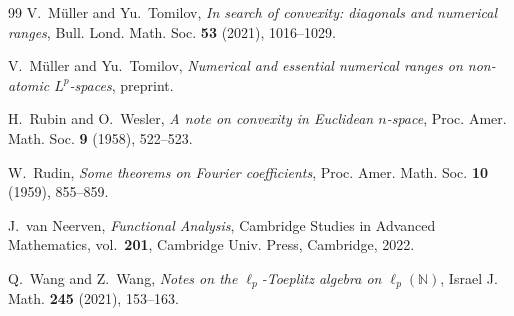 \documentclass[11pt]{amsart}
\numberwithin{equation}{section}
\theoremstyle{definition}
\theoremstyle{remark}
\begin{document}
\begin{thebibliography}{99}
V.~M\"uller and Yu.~Tomilov,
\emph{In search of convexity: diagonals and numerical ranges},
Bull. Lond. Math. Soc. \textbf{53} (2021),  1016--1029.

V.~M\"uller and Yu.~Tomilov,
\emph{Numerical and essential numerical ranges on non-atomic $L^p$-spaces},
preprint.

H.~Rubin and O.~Wesler,
\emph{A note on convexity in Euclidean $n$-space},
Proc. Amer. Math. Soc. \textbf{9} (1958), 522--523.

W.~Rudin,
\emph{Some theorems on Fourier coefficients},
Proc. Amer. Math. Soc. \textbf{10} (1959), 855--859.

J.~van Neerven,
\emph{Functional Analysis},
Cambridge Studies in Advanced Mathematics, vol.~\textbf{201},
Cambridge Univ. Press, Cambridge, 2022.

Q.~Wang and Z.~Wang,
\emph{Notes on the \(\ell_p\)-Toeplitz algebra on \(\ell_p(\mathbb N)\)},
Israel J. Math. \textbf{245} (2021), 153--163.

\end{thebibliography}
\end{document}
